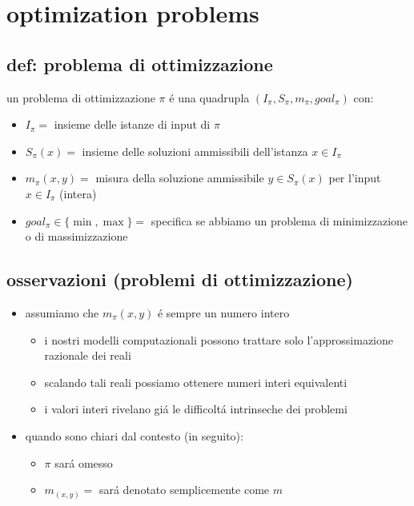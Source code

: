 \section*{optimization problems}


\subsection*{def: problema di ottimizzazione}
\begin{flushleft}
	un problema di ottimizzazione $\pi$ \'e una quadrupla $(I_{\pi}, S_{\pi}, m_{\pi}, goal_{\pi})$ con:
	\begin{itemize}
		\item $I_{\pi}=$ insieme delle istanze di input di $\pi$
		\item $S_{\pi}(x)=$ insieme delle soluzioni ammissibili dell'istanza $x\in I_{\pi}$
		\item $m_{\pi}(x,y)=$ misura della soluzione ammissibile $y\in S_{\pi}(x)$ per l'input $x\in I_{\pi}$ (intera)
		\item $goal_{\pi}\in\{\min,\max\}=$ specifica se abbiamo un problema di minimizzazione o di massimizzazione
	\end{itemize}
\end{flushleft}


\subsection*{osservazioni (problemi di ottimizzazione)}
\begin{flushleft}
	\begin{itemize}
		\item assumiamo che $m_{\pi}(x,y)$ \'e sempre un numero intero
		\begin{itemize}
			\item i nostri modelli computazionali possono trattare solo l'approssimazione razionale dei reali
			\item scalando tali reali possiamo ottenere numeri interi equivalenti
			\item i valori interi rivelano gi\'a le difficolt\'a intrinseche dei problemi
		\end{itemize}
		\item quando sono chiari dal contesto (in seguito):
		\begin{itemize}
			\item $\pi$ sar\'a omesso
			\item $m_(x,y)=$ sar\'a denotato semplicemente come $m$ 
		\end{itemize}
	\end{itemize}
\end{flushleft}

